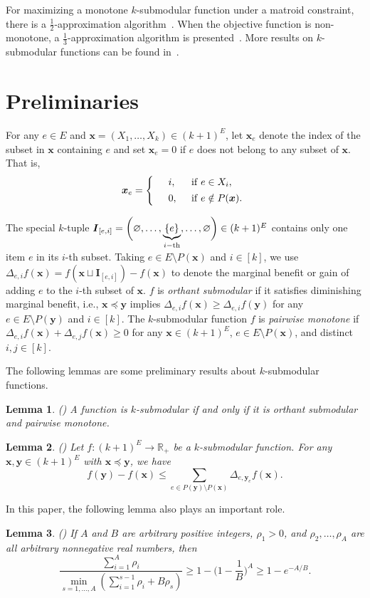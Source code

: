\documentclass[preprint,12pt]{elsarticle}
\newtheorem{lemma}{Lemma}
\newcommand{\bbmat}{\left\{ \begin{array}}
\newcommand{\ebmat}{\end{array} \right. }
\def\bx{\boldsymbol{x}}
\def\by{\boldsymbol{y}}
\def\bI{\boldsymbol{I}}
\begin{document}
For maximizing a monotone $k$-submodular function under a matroid constraint, there is a $\frac{1}{2}$-approximation algorithm~\cite{RY2020,S}. When the objective function is non-monotone, a $\frac{1}{3}$-approximation algorithm is presented~\cite{SLL2022}. More results on $k$-submodular functions can be found
in~\cite{CQDe,SGW,ZCLL}.


\section{Preliminaries}\label{pre}
For any $e\in E$ and $\bx=(X_1,\dots, X_k)\in (k+1)^E$,
let $\bx_e$ denote the index of the subset in $\bx$ containing $e$ and set $\bx_e=0$ if $e$ does not belong to any subset of $\bx$. That is,
\[
\bx_e=\bbmat{rll}
&i, \;\;& {\rm if}\;  e \in X_i, \\ [1ex]
&0, \; \;& {\rm if}\;  e \notin P(\bx).
\ebmat
\]

The special $k$-tuple $\bI_{[e, i]}=\bigg(\varnothing, \ldots, \underbrace{\{e\}}\limits_{i{\rm-th}}, \dots,\varnothing\bigg)\in (k+1)^E$ contains only one item $e$ in its $i$-th subset.
Taking $e\in E\setminus P(\bx)$ and $i\in [k]$, we use $\Delta_{e, i}f(\bx)=f(\bx \sqcup\bI_{[e,i]})-f(\bx)$ to denote the marginal benefit or gain of adding $e$ to the $i$-th subset of $\bx$. $f$ is \emph{orthant submodular} if it satisfies diminishing marginal benefit, i.e., $\bx\preceq\by$ implies $\Delta_{e, i}f(\bx)\ge\Delta_{e, i}f(\by)$ for any  $e\in E\setminus P(\by)$ and $i\in [k]$. %
The $k$-submodular function $f$ is \emph{pairwise monotone} if $\Delta_{e, i}f(\bx)+\Delta_{e, j}f(\bx)\ge0$ for any $\bx\in(k+1)^E$, $e\in E\setminus P(\bx)$, and distinct $i, j \in [k]$.

The following lemmas are some preliminary results about $k$-submodular functions.
\begin{lemma}\label{mon-ksub}
(\cite{JS}) A function is $k$-submodular if and only if it is orthant submodular and pairwise monotone.
\end{lemma}

\begin{lemma}\label{lem-ksub}
(\cite{TWC})
Let $f : (k+1)^E \rightarrow \mathbb{R}_+$ be a $k$-submodular function. For any $\bx,\by\in (k+1)^E$ with $\bx\preceq \by$, we have
\[
f(\by)-f(\bx)\leq \sum_{e\in P(\by)\setminus P(\bx)}\Delta_{e,\by_e}f(\bx).
\]
\end{lemma}

In this paper, the following lemma also plays an important role.
\begin{lemma}\label{lemA111}(\cite{L})
If $A$ and $B$ are  arbitrary positive integers, $\rho_1>0$, and
$\rho_2,\ldots,\rho_A$ are all arbitrary nonnegative real numbers, then
\[
\frac{\sum_{i=1}^{A}\rho_i}{\min_{s=1, \dots, A}(\sum_{i=1}^{s-1}\rho_i+B\rho_s)}\ge 1-\bigg( 1-\frac{1}{B}\bigg) ^A\geq 1-e^{-A/B}.
\]
\end{lemma}
\end{document}
